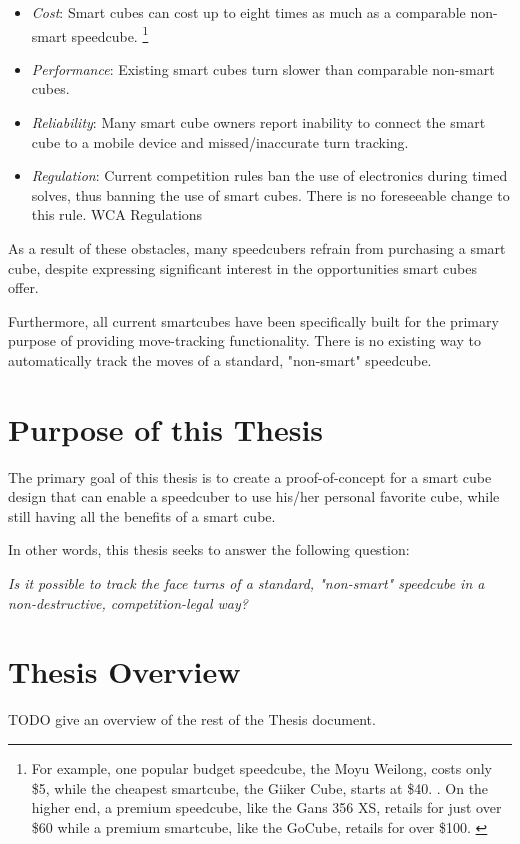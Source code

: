 \begin{itemize}

    \item \emph{Cost}: Smart cubes can cost up to eight times as much
    as a comparable non-smart speedcube. \footnote{For example, one
    popular budget speedcube, the Moyu Weilong, costs only \$5, while
    the cheapest smartcube, the Giiker Cube, starts at \$40.
    \cite{TODO}. On the higher end, a premium speedcube, like the Gans
    356 XS, retails for just over \$60 while a premium smartcube, like
    the GoCube, retails for over \$100. \cite{TODO}}
    
    \item \emph{Performance}: Existing smart cubes turn slower than
    comparable non-smart cubes. \cite{TODO}
    
    \item \emph{Reliability}: Many smart cube owners report inability
    to connect the smart cube to a mobile device and missed/inaccurate
    turn tracking. \cite{TODO}
    
    \item \emph{Regulation}: Current competition rules ban the use of
    electronics during timed solves, thus banning the use of smart
    cubes. There is no foreseeable change to this rule. \cite{TODO} %
    WCA Regulations
    
\end{itemize}

As a result of these obstacles, many speedcubers refrain from
purchasing a smart cube, despite expressing significant interest in the
opportunities smart cubes offer.

Furthermore, all current smartcubes have been specifically built for
the primary purpose of providing move-tracking functionality. There is
no existing way to automatically track the moves of a standard,
"non-smart" speedcube.


\section{Purpose of this Thesis}

The primary goal of this thesis is to create a proof-of-concept for a
smart cube design that can enable a speedcuber to use his/her personal
favorite cube, while still having all the benefits of a smart cube.

In other words, this thesis seeks to answer the following question:

\emph{Is it possible to track the face turns of a standard, "non-smart"
speedcube in a non-destructive, competition-legal way?}

\section{Thesis Overview}

TODO give an overview of the rest of the Thesis document.